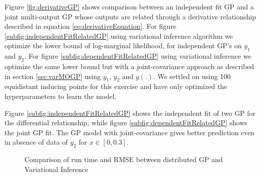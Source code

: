 Figure \ref{fig:derivativeGP} shows comparison between an independent fit GP and a joint multi-output GP whose outputs are related through a derivative relationship described in equation \ref{eq:derivativeEquation}. For figure \ref{subfig:independentFitRelatedGP} using variational inference algorithm we optimize the lower bound of log-marginal likelihood, for independent GP's on \(y_{1}\) and \(y_{2}\). For figure \ref{subfig:dependentFitRelatedGP} using variational inference we optimize the same lower bound but with a joint-covariance approach as described in section \ref{sec:varMOGP} using \(y_{1}\), \(y_{2}\) and \(g(.)\). We settled on using 100 equidistant inducing points for this exercise \cite{icpram16Ankit} and have only optimized the hyperparameters to learn the model. 

Figure \ref{subfig:independentFitRelatedGP} shows the independent fit of two GP for the differential relationship, while figure \ref{subfig:dependentFitRelatedGP} shows the joint GP fit. The GP model with joint-covariance gives better prediction even in absence of data of \(y_{2}\) for \(x \in [0, 0.3]\).

\begin{figure}[!ht]
  \centering
  \quad
  \caption{Comparison of run time and RMSE between distributed GP and Variational Inference}\label{fig:comparisonOfDGPvsVARGP}
\end{figure}

